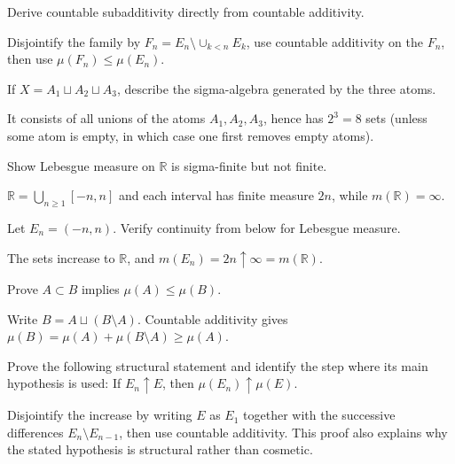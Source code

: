 \begin{problem}\label{prob:iii01-problem-04}
Derive countable subadditivity directly from countable additivity.
\end{problem}
\begin{solution}
Disjointify the family by \(F_n=E_n\setminus\cup_{k<n}E_k\), use countable
additivity on the \(F_n\), then use \(\mu(F_n)\le\mu(E_n)\).
\end{solution}

\begin{problem}\label{prob:iii01-problem-05}
If \(X=A_1\sqcup A_2\sqcup A_3\), describe the sigma-algebra generated by the three atoms.
\end{problem}
\begin{solution}
It consists of all unions of the atoms \(A_1,A_2,A_3\), hence has \(2^3=8\)
sets (unless some atom is empty, in which case one first removes empty atoms).
\end{solution}

\begin{problem}\label{prob:iii01-problem-06}
Show Lebesgue measure on \(\mathbb R\) is sigma-finite but not finite.
\end{problem}
\begin{solution}
\(\mathbb R=\bigcup_{n\ge1}[-n,n]\) and each interval has finite measure
\(2n\), while \(m(\mathbb R)=\infty\).
\end{solution}

\begin{problem}\label{prob:iii01-problem-07}
Let \(E_n=(-n,n)\). Verify continuity from below for Lebesgue measure.
\end{problem}
\begin{solution}
The sets increase to \(\mathbb R\), and \(m(E_n)=2n\uparrow\infty=m(\mathbb R)\).
\end{solution}

\begin{problem}\label{prob:iii01-problem-08}
Prove \(A\subset B\) implies \(\mu(A)\le\mu(B)\).
\end{problem}
\begin{solution}
Write \(B=A\sqcup(B\setminus A)\). Countable additivity gives
\(\mu(B)=\mu(A)+\mu(B\setminus A)\ge\mu(A)\).
\end{solution}

\begin{problem}\label{prob:iii01-problem-09}
Prove the following structural statement and identify the step where its main hypothesis is used: If $E_n\uparrow E$, then $\mu(E_n)\uparrow\mu(E)$.
\end{problem}
\begin{solution}
Disjointify the increase by writing $E$ as $E_1$ together with the successive differences $E_n\setminus E_{n-1}$, then use countable additivity. This proof also explains why the stated hypothesis is structural rather than cosmetic.
\end{solution}


